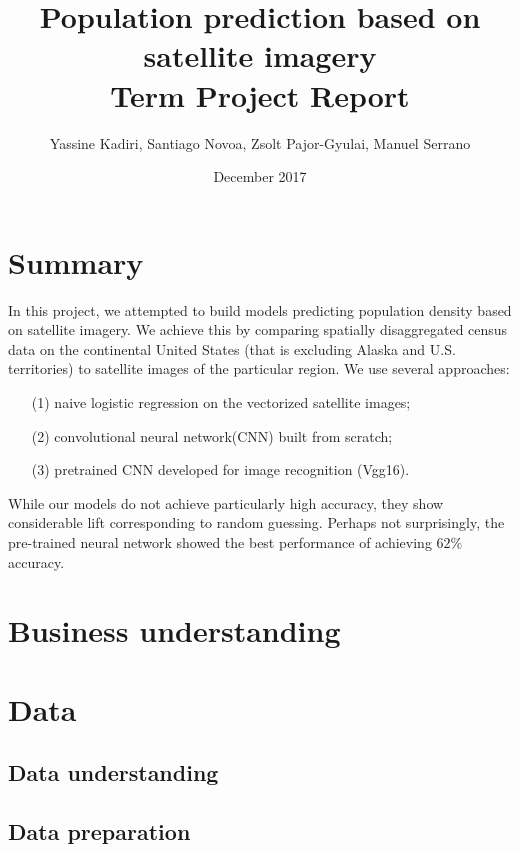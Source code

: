 \documentclass{article}
\begin{document}
\title{Population prediction based on satellite imagery\\
Term Project Report} 

\date{December 2017}
\author{Yassine Kadiri, Santiago Novoa, Zsolt Pajor-Gyulai, Manuel Serrano}
\maketitle

\doublespacing


\section{Summary}
In this project, we attempted to build models predicting population density based on satellite imagery. We achieve this by comparing spatially disaggregated census data on the continental United States (that is excluding Alaska and U.S. territories) to satellite images of the particular region. We use several approaches: 
\begin{itemize}
\item[(1)] naive logistic regression on the vectorized satellite images; 
\item[(2)] convolutional neural network(CNN) built from scratch; \item[(3)] pretrained CNN developed for image recognition (Vgg16).
\end{itemize}

While our models do not achieve particularly high accuracy, they show considerable lift corresponding to random guessing. Perhaps not surprisingly, the pre-trained neural network showed the best performance of achieving $62\%$ accuracy.

\section{Business understanding}


\section{Data}
\subsection{Data understanding}

\subsection{Data preparation}
\end{document}
